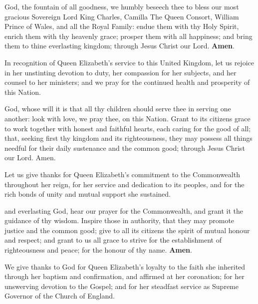  God, the fountain of all goodness, we humbly beseech thee to bless
our most gracious Sovereign Lord King Charles, Camilla The Queen Consort,
William Prince of Wales, and all the Royal Family: endue them with thy Holy Spirit,
enrich them with thy heavenly grace; prosper them with all happiness; and bring them
to thine everlasting kingdom; through Jesus Christ our Lord. \textbf{Amen}.



In recognition of Queen Elizabeth’s service to this United Kingdom, let us rejoice in
her unstinting devotion to duty, her compassion for her subjects, and her counsel to her
ministers; and we pray for the continued health and prosperity of this Nation.

 God, whose will it is that all thy children should serve thee in serving
one another: look with love, we pray thee, on this Nation. Grant to its citizens
grace to work together with honest and faithful hearts, each caring for the good of all;
that, seeking first thy kingdom and its righteousness, they may possess all things needful
for their daily sustenance and the common good; through Jesus Christ our Lord.
Amen.



Let us give thanks for Queen Elizabeth’s commitment to the Commonwealth
throughout her reign, for her service and dedication to its peoples, and for the rich
bonds of unity and mutual support she sustained.

 and everlasting God, hear our prayer for the Commonwealth, and
grant it the guidance of thy wisdom. Inspire those in authority, that they may
promote justice and the common good; give to all its citizens the spirit of mutual honour
and respect; and grant to us all grace to strive for the establishment of righteousness
and peace; for the honour of thy name. \textbf{Amen}.



We give thanks to God for Queen Elizabeth’s loyalty to the faith she inherited through
her baptism and confirmation, and affirmed at her coronation; for her unswerving
devotion to the Gospel; and for her steadfast service as Supreme Governor of the
Church of England.

